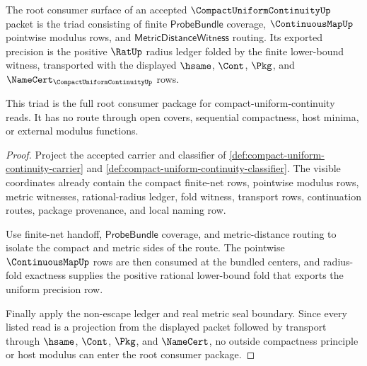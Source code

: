 \begin{theorem}
\label{thm:compact-uniform-continuity-root-consumer-triad}
The root consumer surface of an accepted $\CompactUniformContinuityUp$ packet is the triad consisting of finite $\mathsf{ProbeBundle}$ coverage, $\ContinuousMapUp$ pointwise modulus rows, and $\mathsf{MetricDistanceWitness}$ routing. Its exported precision is the positive $\RatUp$ radius ledger folded by the finite lower-bound witness, transported with the displayed $\hsame$, $\Cont$, $\Pkg$, and $\NameCert_{\CompactUniformContinuityUp}$ rows.

This triad is the full root consumer package for compact-uniform-continuity reads. It has no route through open covers, sequential compactness, host minima, or external modulus functions.
\end{theorem}
\begin{proof}
Project the accepted carrier and classifier of \autoref{def:compact-uniform-continuity-carrier} and \autoref{def:compact-uniform-continuity-classifier}. The visible coordinates already contain the compact finite-net rows, pointwise modulus rows, metric witnesses, rational-radius ledger, fold witness, transport rows, continuation routes, package provenance, and local naming row.

Use finite-net handoff, $\mathsf{ProbeBundle}$ coverage, and metric-distance routing to isolate the compact and metric sides of the route. The pointwise $\ContinuousMapUp$ rows are then consumed at the bundled centers, and radius-fold exactness supplies the positive rational lower-bound fold that exports the uniform precision row.

Finally apply the non-escape ledger and real metric seal boundary. Since every listed read is a projection from the displayed packet followed by transport through $\hsame$, $\Cont$, $\Pkg$, and $\NameCert$, no outside compactness principle or host modulus can enter the root consumer package.
\end{proof}

